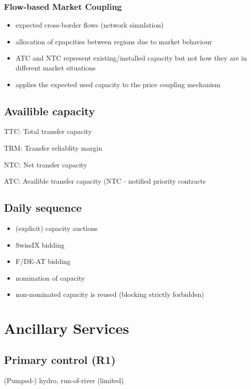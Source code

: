 \documentclass[fs, footer]{latex4ei}
\begin{document}
\begin{multicols*}{4}
\subsubsection{Flow-based Market Coupling}
\begin{itemize}
 	\item expected cross-border flows (network simulation)
 	\item allocation of cpapcities between regions due to market behaviour
 	\item ATC and NTC represent existing/installed capacity but not how they are in different market situations
 	\item applies the expected used capacity to the price coupling mechanism
 \end{itemize} 

\subsection{Availible capacity}
TTC: Total transfer capacity

TRM: Transfer reliablity margin

NTC: Net transfer capacity

ATC: Availible transfer capacity (NTC - notified priority contracts

\subsection{Daily sequence}

\begin{itemize}
 	\item (explicit) capacity auctions
 	\item SwissIX bidding
 	\item F/DE-AT bidding
 	\item nomination of capacity
 	\item non-nominated capacity is reused (blocking strictly forbidden)
 \end{itemize} 
\section{Ancillary Services}


\subsection{Primary control (R1)}
(Pumped-) hydro, run-of-river (limited)


\end{multicols*}
\end{document}
